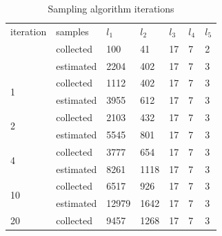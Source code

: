 \documentclass{article}
\begin{document}
\begin{table}[]
\caption{Sampling algorithm iterations}
\centering

\begin{tabular}{|l|l|l|l|l|l|l|}
\hline
iteration                                  & samples  & $l_{1}$     & $l_{2}$   & $l_{3}$  & $l_{4}$ & $l_{5}$ \\ \hhline{|=|=|=|=|=|=|=|}
{\multirow{2}{*}{0}} & collected & 100    & 41    & 17  & 7  & 2  \\ 
                   & estimated & 2204   & 402   & 17  & 7  & 3  \\ \hline
\multirow{2}{*}{1}                       & collected & 1112   & 402   & 17  & 7  & 3  \\  
                                         & estimated & 3955   & 612   & 17  & 7  & 3  \\ \hline
\multirow{2}{*}{2}                       & collected & 2103   & 432   & 17  & 7  & 3  \\  
                                         & estimated & 5545   & 801   & 17  & 7  & 3  \\ \hline
\multirow{2}{*}{4}                       & collected & 3777   & 654   & 17  & 7  & 3  \\  
                                         & estimated & 8261   & 1118  & 17  & 7  & 3  \\ \hline
\multirow{2}{*}{10}                      & collected & 6517   & 926   & 17  & 7  & 3  \\  
                                         & estimated & 12979  & 1642  & 17  & 7  & 3  \\ \hline
\multirow{2}{*}{20}                      & collected & 9457   & 1268  & 17  & 7  & 3  \\  

\end{tabular}
\end{table}
\end{document}
